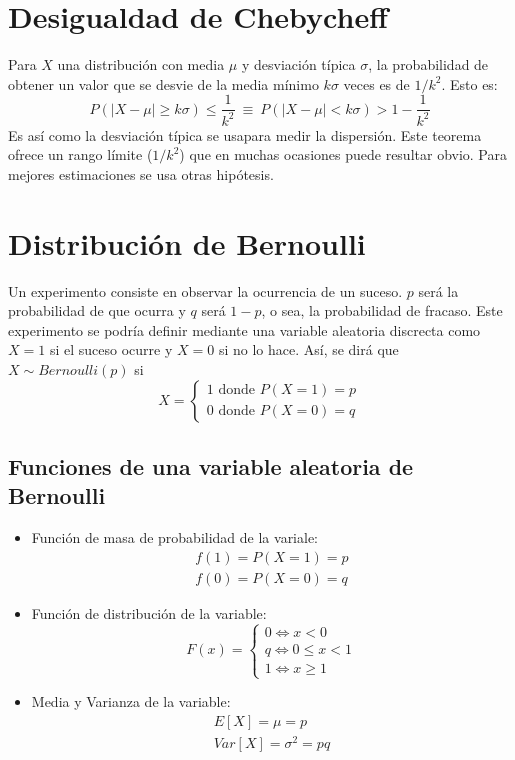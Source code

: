 \documentclass[10pt,a4paper]{book}
\begin{document}
\section{Desigualdad de Chebycheff}
Para $X$ una distribución con media $\mu$ y desviación típica $\sigma$, la probabilidad de obtener un valor que se desvie de la media mínimo $k\sigma$ veces es de $1/k^2$. Esto es:
\[P(|X-\mu|\geq k\sigma)\leq\frac 1{k^2}\:\equiv\: P(|X-\mu|<k\sigma)>1-\frac 1{k^2}\]
Es así como la desviación típica se usapara medir la dispersión. Este teorema ofrece un rango límite ($1/k^2$) que en muchas ocasiones puede resultar obvio. Para mejores estimaciones se usa otras hipótesis.
\section{Distribución de Bernoulli}
Un experimento consiste en observar la ocurrencia de un suceso. $p$ será la probabilidad de que ocurra y $q$ será $1-p$, o sea, la probabilidad de fracaso. Este experimento se podría definir mediante una variable aleatoria discrecta como $X=1$ si el suceso ocurre y $X=0$ si no lo hace.
Así, se dirá que $X\sim Bernoulli(p)$ si
\[
	X=\begin{cases}
		1\text{ donde }P(X=1)=p\\
		0\text{ donde }P(X=0)=q
	\end{cases}
\]
\subsection{Funciones de una variable aleatoria de Bernoulli}
\begin{itemize}
	\item Función de masa de probabilidad de la variale:
		\[\begin{array}{c}
			f(1) = P(X=1)=p\\
		f(0) = P(X=0)=q
	\end{array}\]
	\item Función de distribución de la variable:
		\[F(x) = \begin{cases}
			0\iff x<0\\
			q \iff 0\leq x<1\\
			1 \iff x\geq 1\end{cases}\]

	\item Media y Varianza de la variable:
		\[\begin{array}{c}
			E[X] = \mu = p\\
			Var[X] = \sigma^2 = pq
		\end{array}\]
\end{itemize}
\end{document}
